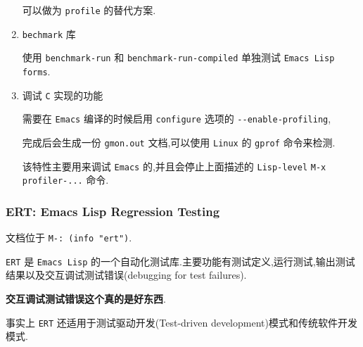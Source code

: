 \documentclass[11pt]{article}
\begin{document}
\begin{enumerate}
可以做为 \texttt{profile} 的替代方案.

\item \texttt{bechmark} 库

使用 \texttt{benchmark-run} 和 \texttt{benchmark-run-compiled} 单独测试 \texttt{Emacs Lisp forms}.

\item 调试 \texttt{C} 实现的功能

需要在 \texttt{Emacs} 编译的时候启用 \texttt{configure} 选项的 \texttt{-{}-{}enable-profiling},

完成后会生成一份 \texttt{gmon.out} 文档,可以使用 \texttt{Linux} 的 \texttt{gprof} 命令来检测.

该特性主要用来调试 \texttt{Emacs} 的,并且会停止上面描述的 \texttt{Lisp-level} \texttt{M-x profiler-...} 命令.
\end{enumerate}



\subsubsection{ERT: Emacs Lisp Regression Testing}
\label{sec:org01f1f9c}

文档位于 \texttt{M-: (info "ert")}.

\texttt{ERT} 是 \texttt{Emacs Lisp} 的一个自动化测试库.主要功能有测试定义,运行测试,输出测试结果以及交互调试测试错误(debugging for test failures).

\textbf{交互调试测试错误这个真的是好东西}.

事实上 \texttt{ERT} 还适用于测试驱动开发(Test-driven development)模式和传统软件开发模式.
\end{document}
